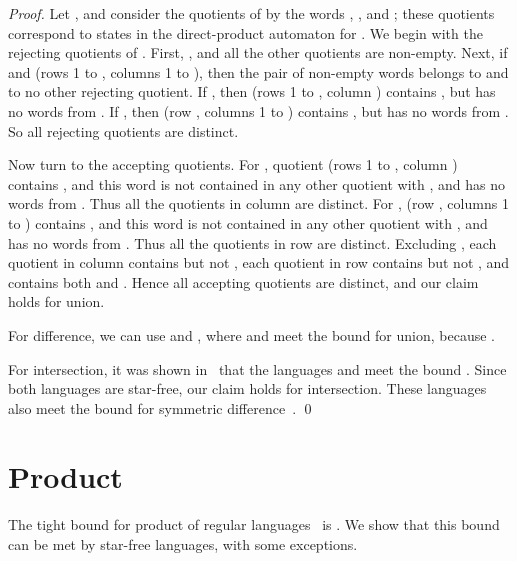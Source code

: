 \documentclass{llncs}
\begin{document}
\begin{proof}
Let , and consider the quotients of  by the  words , , and ;
these quotients  correspond to states  in the direct-product automaton for .
We begin with the rejecting quotients of . 
First, , and all the other quotients are non-empty.
Next, if  and  (rows 1 to , columns 1 to ), then 
the  pair  of non-empty words  belongs to  and to no other rejecting quotient.
If , then  (rows 1 to , column ) contains , but has no words from .
If  , then  (row , columns 1 to )  contains , but has no words from .
So all  rejecting  quotients are distinct.


Now turn to the accepting quotients.
For , quotient  (rows 1 to , column ) contains , and this word is not contained in any other quotient  with , and  has no words from . 
Thus all the quotients in column  are distinct.
For ,   (row , columns 1 to ) contains , and this word is not contained in any other quotient  with , 
and  has no words from . 
Thus all the quotients in row  are distinct.
Excluding , each quotient in  column   contains  but not , each quotient in row   contains  but not , and   contains both  and . Hence all accepting quotients are distinct, and
 our claim holds for union.
\goodbreak

For difference, we can use  and , where  and  meet the bound  for union,
because
.

For intersection, it was shown in~\cite{BJL10} that the languages 
 and
 meet the bound .
Since both languages are star-free, our claim holds for intersection.
These languages  also meet the bound  for symmetric difference~\cite{BJL10}.
\qed
\end{proof}



\section{Product}
\label{sec:product}


The tight bound for  product of  regular languages~\cite{Mas70,YZS94} is  .
We  show that this bound can be met by star-free languages, with some  exceptions. 
\end{document}

